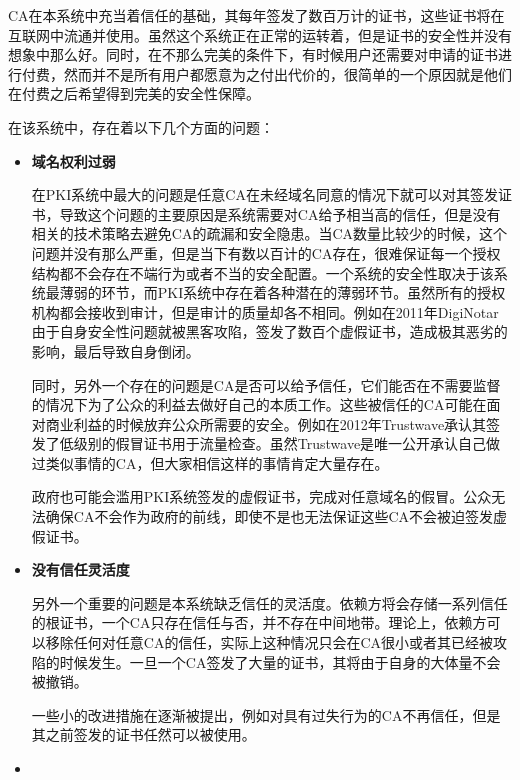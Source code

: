 CA在本系统中充当着信任的基础，其每年签发了数百万计的证书，这些证书将在互联网中流通并使用。虽然这个系统正在正常的运转着，但是证书的安全性并没有想象中那么好。同时，在不那么完美的条件下，有时候用户还需要对申请的证书进行付费，然而并不是所有用户都愿意为之付出代价的，很简单的一个原因就是他们在付费之后希望得到完美的安全性保障。

在该系统中，存在着以下几个方面的问题\supercite{ristic2014bulletproof}：


\begin{itemize}
	\item

	\noindent\textbf{域名权利过弱}

	在PKI系统中最大的问题是任意CA在未经域名同意的情况下就可以对其签发证书，导致这个问题的主要原因是系统需要对CA给予相当高的信任，但是没有相关的技术策略去避免CA的疏漏和安全隐患。当CA数量比较少的时候，这个问题并没有那么严重，但是当下有数以百计的CA存在，很难保证每一个授权结构都不会存在不端行为或者不当的安全配置。一个系统的安全性取决于该系统最薄弱的环节，而PKI系统中存在着各种潜在的薄弱环节。虽然所有的授权机构都会接收到审计，但是审计的质量却各不相同。例如在2011年DigiNotar由于自身安全性问题就被黑客攻陷\cite{prins2011diginotar}，签发了数百个虚假证书，造成极其恶劣的影响，最后导致自身倒闭。

	同时，另外一个存在的问题是CA是否可以给予信任，它们能否在不需要监督的情况下为了公众的利益去做好自己的本质工作。这些被信任的CA可能在面对商业利益的时候放弃公众所需要的安全。例如在2012年Trustwave承认其签发了低级别的假冒证书用于流量检查。虽然Trustwave是唯一公开承认自己做过类似事情的CA，但大家相信这样的事情肯定大量存在。

	政府也可能会滥用PKI系统签发的虚假证书，完成对任意域名的假冒。公众无法确保CA不会作为政府的前线，即使不是也无法保证这些CA不会被迫签发虚假证书。



	\item

	\noindent\textbf{没有信任灵活度}

	另外一个重要的问题是本系统缺乏信任的灵活度。依赖方将会存储一系列信任的根证书，一个CA只存在信任与否，并不存在中间地带。理论上，依赖方可以移除任何对任意CA的信任，实际上这种情况只会在CA很小或者其已经被攻陷的时候发生。一旦一个CA签发了大量的证书，其将由于自身的大体量不会被撤销。

	一些小的改进措施在逐渐被提出，例如对具有过失行为的CA不再信任，但是其之前签发的证书任然可以被使用。

	\item


\end{itemize}
